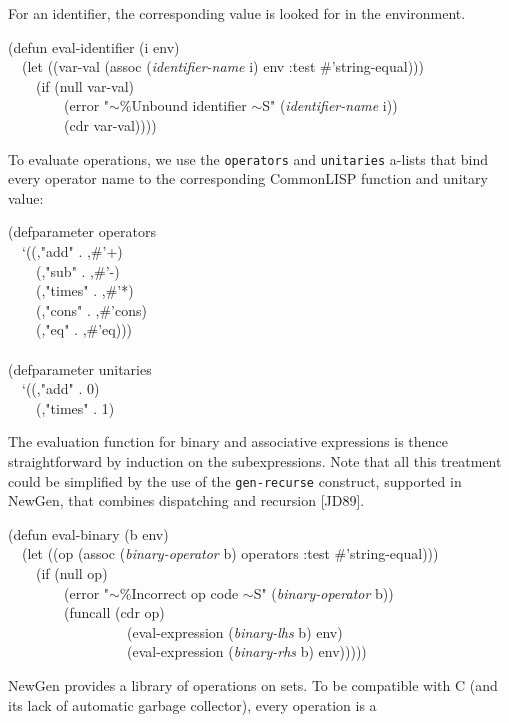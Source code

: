 For an identifier, the corresponding value is looked for in the
environment. 
\begin{pgm}
(defun eval-identifier (i env) \\
~~(let ((var-val (assoc ({\sl identifier-name} i) env :test
					\#'string-equal))) \\
~~~~(if (null var-val) \\
~~~~~~~~(error "$\sim$\%Unbound identifier $\sim$S" ({\sl identifier-name} i)) \\
~~~~~~~~(cdr var-val))))
\end{pgm}
To evaluate operations, we use the {\tt operators} and {\tt unitaries}
a-lists that bind every operator name to the corresponding CommonLISP
function and unitary value:
\begin{pgm}
(defparameter operators \\
~~`((,"add" . ,\#'+) \\
~~~~(,"sub" . ,\#'-) \\
~~~~(,"times" . ,\#'*) \\
~~~~(,"cons" . ,\#'cons) \\
~~~~(,"eq" . ,\#'eq))) \\
 \\
(defparameter unitaries \\
~~`((,"add" . 0) \\
~~~~(,"times" . 1) 
\end{pgm}
The evaluation function for binary and associative expressions is thence
straightforward by induction on the subexpressions. Note that all this
treatment could be simplified by the use of the {\tt gen-recurse}
construct, supported in NewGen, that combines dispatching and recursion
[JD89].
\begin{pgm}
(defun eval-binary (b env) \\
~~(let ((op (assoc ({\sl binary-operator} b) operators 
			:test \#'string-equal))) \\
~~~~(if (null op) \\
~~~~~~~~(error "$\sim$\%Incorrect op code $\sim$S" ({\sl binary-operator} b)) \\
~~~~~~~~(funcall (cdr op) \\
~~~~~~~~~~~~~~~~~(eval-expression ({\sl binary-lhs} b) env) \\
~~~~~~~~~~~~~~~~~(eval-expression ({\sl binary-rhs} b) env))))) 
\end{pgm}
NewGen provides a library of operations on sets. To be compatible with C
(and its lack of automatic garbage collector), every operation is a
